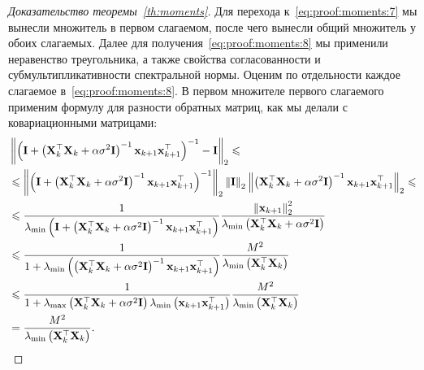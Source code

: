 \begin{proof}[Доказательство теоремы~\ref{th:moments}]
    Для перехода к~\eqref{eq:proof:moments:7} мы вынесли множитель в первом слагаемом, после чего вынесли общий множитель у обоих слагаемых. Далее для получения~\eqref{eq:proof:moments:8} мы  применили неравенство треугольника, а также свойства согласованности и субмультипликативности спектральной нормы. Оценим по отдельности каждое слагаемое в~\eqref{eq:proof:moments:8}. В первом множителе первого слагаемого применим формулу для разности обратных матриц, как мы делали с ковариационными матрицами:
    \begin{align}
        & \left\| \left( \mathbf{I} + \left( \mathbf{X}_k^\top \mathbf{X}_k + \alpha \sigma^2 \mathbf{I} \right)^{-1} \mathbf{x}_{k+1} \mathbf{x}_{k+1}^\top \right)^{-1} - \mathbf{I} \right\|_2 \leqslant \notag \\
        &\leqslant \left\| \left( \mathbf{I} + \left( \mathbf{X}_k^\top \mathbf{X}_k + \alpha \sigma^2 \mathbf{I} \right)^{-1} \mathbf{x}_{k+1} \mathbf{x}_{k+1}^\top \right)^{-1} \right\|_2 \left\| \mathbf{I} \right\|_2 \left\| \left( \mathbf{X}_k^\top \mathbf{X}_k + \alpha \sigma^2 \mathbf{I} \right)^{-1} \mathbf{x}_{k+1} \mathbf{x}_{k+1}^\top \right\|_2 \leqslant \notag \\
        &\leqslant \frac{1}{\lambda_{\min}\left( \mathbf{I} + \left( \mathbf{X}_k^\top \mathbf{X}_k + \alpha \sigma^2 \mathbf{I} \right)^{-1} \mathbf{x}_{k+1} \mathbf{x}_{k+1}^\top \right)} \frac{\left\| \mathbf{x}_{k+1} \right\|_2^2}{\lambda_{\min}\left( \mathbf{X}_k^\top \mathbf{X}_k + \alpha \sigma^2 \mathbf{I} \right)} \label{eq:proof:moments:9} \\
        &\leqslant \frac{1}{1 + \lambda_{\min}\left(\left( \mathbf{X}_k^\top \mathbf{X}_k + \alpha \sigma^2 \mathbf{I} \right)^{-1} \mathbf{x}_{k+1} \mathbf{x}_{k+1}^\top \right)} \frac{M^2}{\lambda_{\min}\left( \mathbf{X}_k^\top \mathbf{X}_k \right)} \notag \\
        & \leqslant \frac{1}{1 + \lambda_{\max}\left( \mathbf{X}_k^\top \mathbf{X}_k + \alpha \sigma^2 \mathbf{I} \right) \lambda_{\min}\left( \mathbf{x}_{k+1} \mathbf{x}_{k+1}^\top \right)} \frac{M^2}{\lambda_{\min}\left( \mathbf{X}_k^\top \mathbf{X}_k \right)} \notag \\
        &= \frac{M^2}{\lambda_{\min}\left( \mathbf{X}_k^\top \mathbf{X}_k \right)}. \label{eq:proof:moments:10}
    \end{align}


\end{proof}
